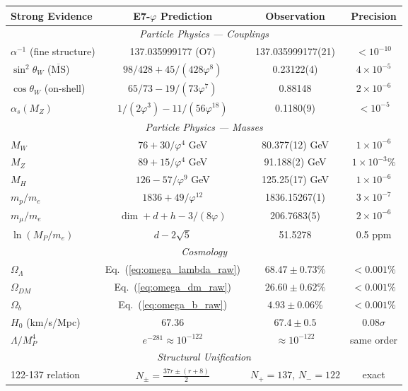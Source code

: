 \documentclass[11pt,a4paper]{article}
\begin{document}
\begin{center}
\begin{tabular}{|l|c|c|c|}
\hline
\textbf{Strong Evidence} & \textbf{E7-$\varphi$ Prediction} & \textbf{Observation} & \textbf{Precision} \\
\hline
\multicolumn{4}{|c|}{\textit{Particle Physics --- Couplings}} \\
\hline
$\alpha^{-1}$ (fine structure) & 137.035999177 (O7) & 137.035999177(21) & $< 10^{-10}$ \\
$\sin^2\theta_W$ ($\overline{\text{MS}}$) & $98/428 + 45/(428\varphi^8)$ & 0.23122(4) & $4 \times 10^{-5}$ \\
$\cos\theta_W$ (on-shell) & $65/73 - 19/(73\varphi^7)$ & 0.88148 & $2 \times 10^{-6}$ \\
$\alpha_s(M_Z)$ & $1/(2\varphi^3) - 11/(56\varphi^{18})$ & 0.1180(9) & $< 10^{-5}$ \\
\hline
\multicolumn{4}{|c|}{\textit{Particle Physics --- Masses}} \\
\hline
$M_W$ & $76 + 30/\varphi^4$ GeV & 80.377(12) GeV & $1 \times 10^{-6}$ \\
$M_Z$ & $89 + 15/\varphi^4$ GeV & 91.188(2) GeV & $1 \times 10^{-3}\%$ \\
$M_H$ & $126 - 57/\varphi^9$ GeV & 125.25(17) GeV & $1 \times 10^{-6}$ \\
$m_p/m_e$ & $1836 + 49/\varphi^{12}$ & 1836.15267(1) & $3 \times 10^{-7}$ \\
$m_\mu/m_e$ & $\dim + d + h - 3/(8\varphi)$ & 206.7683(5) & $2 \times 10^{-6}$ \\
$\ln(M_P/m_e)$ & $d - 2\sqrt{5}$ & 51.5278 & 0.5 ppm \\
\hline
\multicolumn{4}{|c|}{\textit{Cosmology}} \\
\hline
$\Omega_\Lambda$ & Eq.~(\ref{eq:omega_lambda_raw}) & $68.47 \pm 0.73\%$ & $< 0.001\%$ \\
$\Omega_{DM}$ & Eq.~(\ref{eq:omega_dm_raw}) & $26.60 \pm 0.62\%$ & $< 0.001\%$ \\
$\Omega_b$ & Eq.~(\ref{eq:omega_b_raw}) & $4.93 \pm 0.06\%$ & $< 0.001\%$ \\
$H_0$ (km/s/Mpc) & 67.36 & $67.4 \pm 0.5$ & $0.08\sigma$ \\
$\Lambda/M_P^4$ & $e^{-281} \approx 10^{-122}$ & $\approx 10^{-122}$ & same order \\
\hline
\multicolumn{4}{|c|}{\textit{Structural Unification}} \\
\hline
122-137 relation & $N_\pm = \frac{37r \pm (r+8)}{2}$ & $N_+ = 137$, $N_- = 122$ & exact \\

\end{tabular}
\end{center}
\end{document}
